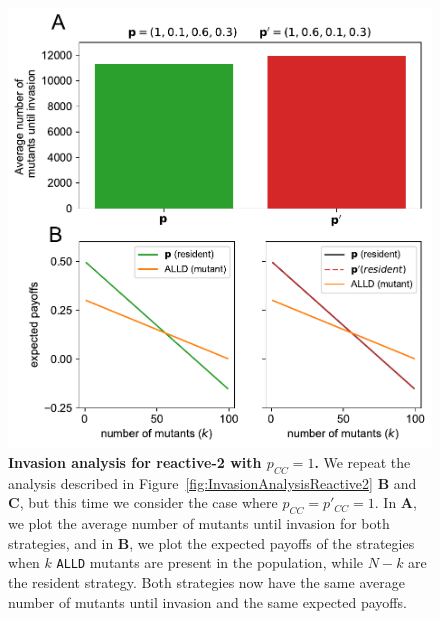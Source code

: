\documentclass[11pt]{article}
\theoremstyle{plainCl1}
\theoremstyle{plainCl2}
\def\alld{\texttt{ALLD}}
\begin{document}
\begin{figure}[tbhp]
  \centering
  \includegraphics[width=.65\textwidth]{../../figures/siFigInvasionR2ForPCCone.pdf}
  \caption{\textbf{Invasion analysis for reactive-2 with $p_{CC}=1$.}
  We repeat the analysis described in Figure~\ref{fig:InvasionAnalysisReactive2}
  {\bf B} and {\bf C}, but this time we consider the case where \(p_{CC} = p'_{CC}
  = 1\). In {\bf A}, we plot the average number of mutants until invasion for both
  strategies, and in {\bf B}, we plot the expected payoffs of the strategies when
  \(k\) \alld{} mutants are present in the population, while \(N-k\) are the
  resident strategy. Both strategies now have the same average number of mutants
  until invasion and the same expected payoffs.
  }\label{fig:InvasionAnalysisReactive2ForPCCone}
\end{figure}
\end{document}
